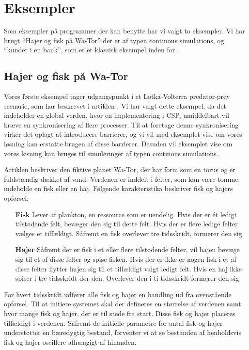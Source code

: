 \section{Eksempler}\label{sec:des-examples}
Som eksempler på programmer der kan benytte \des har vi valgt to eksempler. Vi har brugt ``Hajer og fisk på Wa-Tor'' der er af typen  continous simulations, og ``kunder i  en bank'', som er et klassisk eksempel inden for \des. 

\subsection{Hajer og fisk på Wa-Tor} 
Vores første eksempel tager  udgangspunkt i et Lotka-Volterra predator-prey scenarie, som \citeauthor{wator}
har beskrevet i artiklen \cite{wator}. Vi har valgt dette eksempel, da det indeholder en global verden, hvor en implementering  i CSP, umiddelbart vil kræve en synkronisering af flere processer. Til at foretage denne synkronisering  virker det oplagt at introducere barrierer, og vi vil med eksemplet vise om vores løsning kan erstatte brugen af disse barrierer. Desuden vil eksemplet vise om vores løsning kan bruges til simuleringer af typen continous simulations.

Artiklen beskriver den
fiktive planet Wa-Tor, der har form som en torus og er fuldstændig
dækket af vand. Verdenen er inddelt i felter, som kan være tomme, indeholde en
fisk eller en haj\cite[20]{wator}. Følgende karakteristika beskriver fisk og hajers
opførsel:

\begin{itemize}
\item[\textbf{Fisk}]
Lever af plankton, en ressource som er uendelig. Hvis der er ét ledigt 
tilstødende felt, bevæger den sig til dette felt. Hvis der er flere ledige 
felter vælges et tilfældigt. Såfremt en fisk overlever tre tidsskridt, formerer 
den sig.
\item[\textbf{Hajer}]
Såfremt der er fisk i et eller flere tilstødende felter, vil hajen bevæge sig 
til et af disse felter og spise fisken. Hvis der er ikke er nogen fisk i et af 
disse felter flytter hajen sig til et tilfældigt valgt ledigt felt. Hvis en haj 
ikke spiser i tre tidsskridt dør den. Overlever den i ti tidsskridt formerer 
den sig.
\end{itemize}

For hvert tidsskridt udfører alle fisk og hajer en handling ud fra
ovenstående opførsel.
Til at initiere systemet skal der defineres en størrelse af verdenen
samt hvor mange fisk og hajer, der er til stede fra start. Disse fisk og
hajer placeres tilfældigt i verdenen.
Såfremt de initielle parametre for antal fisk og hajer understøtter en 
bæredygtig bestand, forventer vi at se bestanden af henholdsvis fisk og hajer 
oscillere afhængigt af hinanden.

